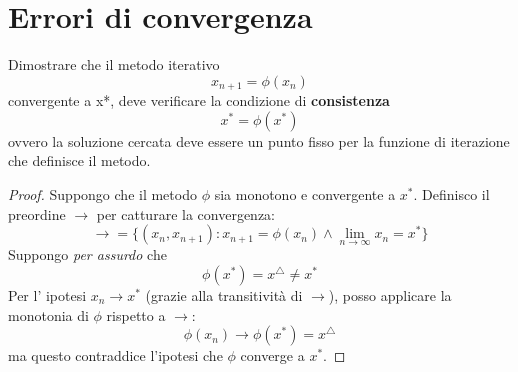 \section{Errori di convergenza}

\begin{exercise}[1.3]
Dimostrare che il metodo iterativo $$x_{n+1}=\phi(x_{n})$$ convergente a x*,
deve verificare la condizione di \textbf{consistenza} $$x^{*}=\phi(x^{*})$$
ovvero la soluzione cercata deve essere un punto fisso per la funzione di
iterazione che definisce il metodo.
\begin{proof}
Suppongo che il metodo $\phi$ sia monotono e convergente a $x^{*}$. Definisco
il preordine $\rightarrow$ per catturare la convergenza:
\begin{displaymath}
\rightarrow = \lbrace (x_{n}, x_{n+1}) : x_{n+1} = \phi(x_{n}) \wedge \lim_{n
\rightarrow \infty}{x_{n}} = x^{*}
\rbrace
\end{displaymath}
Suppongo \emph{per assurdo} che $$\phi(x^{*}) = x^{\triangle} \not = x^{*}$$
Per l' ipotesi $x_{n} \rightarrow x^{*}$ (grazie alla transitivit\`a di
$\rightarrow$), posso applicare la monotonia di $\phi$ rispetto a $\rightarrow$:
$$\phi(x_{n}) \rightarrow \phi(x^{*}) = x^{\triangle}$$ ma questo contraddice 
l'ipotesi che $\phi$ converge a $x^{*}$.
\end{proof}
\end{exercise}
